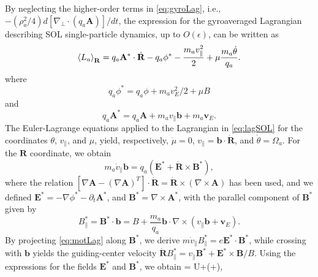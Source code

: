 By neglecting the higher-order terms in \cref{eq:gyroLag}, i.e., $-(\rho_a^2/4){d }\left[\nabla_\perp\cdot\left(q_a \mathbf A\right)\right]/{dt}$, the expression for the gyroaveraged Lagrangian describing SOL single-particle dynamics, up to $O(\epsilon)$, can be written as
%
\begin{equation}
    \left< L_a \right>_{\mathbf R} = q_a \mathbf A^* \cdot \dot{\mathbf R} - q_a \phi^* -\frac{m_a v_\parallel^2}{2}+ \mu \frac{m_a \dot \theta}{q_a}.
    \label{eq:lagSOL}
\end{equation}
%
where
%
\begin{equation}
    q_a\phi^* = q_a\phi+ m_a v_E^2/2+\mu B
\label{eq:phis}
\end{equation}
%
and
%
\begin{equation}
    q_a\mathbf A^* = q_a \mathbf A  + m_a v_\parallel \mathbf b + m_a \mathbf v_E.
\label{eq:As}
\end{equation}
%
The Euler-Lagrange equations applied to the Lagrangian in \cref{eq:lagSOL} for the coordinates $\theta$, $v_\parallel$, and $\mu$, yield, respectively, $\dot \mu = 0$, $v_\parallel = \mathbf b \cdot \dot{\mathbf R}$, and $\dot \theta = \Omega_a$. For the ${\mathbf R}$ coordinate, we obtain
%
\begin{equation}
    m_a \dot v_\parallel \mathbf b = q_a (\mathbf E^* + \dot{\mathbf R}\times \mathbf B^*),
    \label{eq:motLag}
\end{equation}
%
where the relation $[\nabla \mathbf A - (\nabla \mathbf A)^T] \cdot \dot{\mathbf R} = \dot{\mathbf R}\times (\nabla \times \mathbf A)$ has been used, and we defined $\mathbf E^* = -\nabla \phi^* - \partial_t \mathbf A^*$, and $\mathbf B^* = \nabla \times \mathbf A^*$, with the parallel component of $\mathbf B^{*}$ given by
%
\begin{equation}
    B_{\parallel}^* = \mathbf B^* \cdot \mathbf b = B + \frac{m_a}{q_a}\mathbf b \cdot \nabla \times \left(v_\parallel \mathbf b + \mathbf v_E\right).
\label{eq:defbpars}    
\end{equation}
%
By projecting \cref{eq:motLag} along $\mathbf B^*$, we derive $m \dot v_\parallel B_\parallel^*= e \mathbf E^* \cdot \mathbf B^*$, while crossing with $\mathbf b$ yields the guiding-center velocity $\dot{\mathbf R} B_\parallel^* = v_\parallel \mathbf B^* + \mathbf E^* \times \mathbf B/B$. Using the expressions for the fields $\mathbf E^{*}$ and $\mathbf B^{*}$, we obtain 
%
\be
      = \mathbf U+\times\left(+\right),
